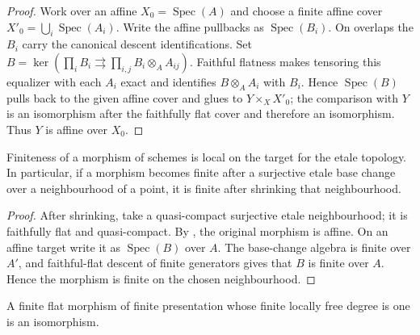 \begin{proof}
  Work over an affine $X_0=\operatorname{Spec}(A)$ and choose a finite affine
  cover $X'_0=\bigcup_i\operatorname{Spec}(A_i)$.  Write the affine pullbacks
  as $\operatorname{Spec}(B_i)$.  On overlaps the $B_i$ carry the canonical
  descent identifications.  Set
  $B=\ker(\prod_iB_i\rightrightarrows\prod_{i,j}B_i\otimes_AA_{ij})$.
  Faithful flatness makes tensoring this equalizer with each $A_i$ exact and
  identifies $B\otimes_AA_i$ with $B_i$.  Hence $\operatorname{Spec}(B)$
  pulls back to the given affine cover and glues to $Y\times_XX'_0$; the
  comparison with $Y$ is an isomorphism after the faithfully flat cover and
  therefore an isomorphism.  Thus $Y$ is affine over $X_0$.
\end{proof}

\begin{lemma}
  \label{lemma:nagata-finite-etale-local-on-target}

  Finiteness of a morphism of schemes is local on the target for the etale
  topology.  In particular, if a morphism becomes finite after a surjective
  etale base change over a neighbourhood of a point, it is finite after
  shrinking that neighbourhood.
\end{lemma}

\begin{proof}
  After shrinking, take a quasi-compact surjective etale neighbourhood; it is
  faithfully flat and quasi-compact.  By
  , the original morphism is
  affine.  On an affine target write it as $\operatorname{Spec}(B)$ over
  $A$.  The base-change algebra is finite over $A'$, and faithful-flat descent
  of finite generators gives that $B$ is finite over $A$.  Hence the morphism
  is finite on the chosen neighbourhood.
\end{proof}

\begin{lemma}
  \label{lemma:nagata-finite-flat-degree-one-iso}

  A finite flat morphism of finite presentation whose finite locally free
  degree is one is an isomorphism.
\end{lemma}

